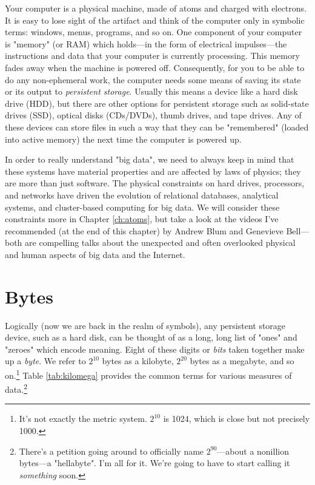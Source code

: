 \documentclass[11pt]{book}
\newcommand{\term}[1]{\emph{#1}} %
\begin{document}
Your computer is a physical machine, made of atoms and charged with electrons.  It is easy to lose sight of the artifact and think of the computer only in symbolic terms: windows, menus, programs, and so on.  One component of your computer is "memory" (or RAM) which holds---in the form of  electrical impulses---the instructions and data that your computer is currently processing.  This memory fades away when the machine is powered off.  Consequently, for you to be able to do any non-ephemeral work, the computer needs some means of saving its state or its output to \term{persistent storage}.  Usually this means a device like a hard disk drive (HDD), but there are other options for persistent storage such as solid-state drives (SSD), optical disks (CDs/DVDs), thumb drives, and tape drives.  Any of these devices can store files in such a way that they can be "remembered" (loaded into active memory) the next time the computer is powered up.

In order to really understand "big data", we need to always keep in mind that these systems have material properties and are affected by laws of physics; they are more than just software.  The physical constraints on hard drives, processors, and networks have driven the evolution of relational databases, analytical systems, and cluster-based computing for big data. We will consider these constraints more in Chapter \ref{ch:atoms}, but take a look at the videos I've recommended (at the end of this chapter) by Andrew Blum and Genevieve Bell---both are compelling talks about the unexpected and often overlooked physical and human aspects of big data and the Internet.

\section{Bytes}

Logically (now we are back in the realm of symbols), any persistent storage device, such as a hard disk, can be thought of as a long, long list of "ones" and "zeroes" which encode meaning.  Eight of these digits or \term{bits} taken together make up a \term{byte}.  We refer to $2^{10}$ bytes as a kilobyte, $2^{20}$ bytes as a megabyte, and so on.\footnote{It's not exactly the metric system.  $2^{10}$ is 1024, which is close but not precisely 1000.}  Table \ref{tab:kilomega} provides the common terms for various measures of data.\footnote{There's a petition going around to officially name $2^{90}$---about a nonillion bytes---a "hellabyte".  I'm all for it.  We're going to have to start calling it \emph{something} soon.}
\end{document}
